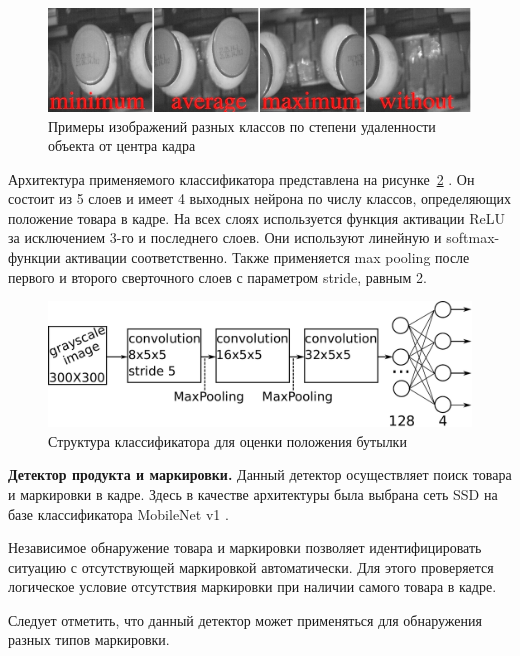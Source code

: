 \begin{figure}[ht]
	\centering
	\includegraphics[width=16cm]{man-source/images/ch4/pic4-24.jpg}
	\caption{Примеры изображений разных классов по степени удаленности объекта от центра кадра}
	\label{fig:distance_classes}
\end{figure}

Архитектура применяемого классификатора представлена на рисунке~\ref{fig:nn_class1} \cite{7-A}. Он состоит из 5 слоев и имеет 4 выходных нейрона по числу классов, определяющих положение товара в кадре. На всех слоях используется функция активации ReLU за исключением 3-го и последнего слоев. Они используют линейную и softmax-функции активации соответственно. Также применяется max pooling после первого и второго сверточного слоев с параметром stride, равным 2.

\begin{figure}[ht]
	\centering
	\includegraphics[width=16cm]{man-source/images/ch4/pic4-4.pdf}
	\caption{Структура классификатора для оценки положения бутылки \cite{26-A}}
	\label{fig:nn_class1}
\end{figure}

\textbf{Детектор продукта и маркировки.} Данный детектор осуществляет поиск товара и маркировки в кадре. Здесь в качестве архитектуры была выбрана сеть SSD \cite[c.~2-4]{liu} на базе классификатора MobileNet v1 \cite[c.~4]{howard}.

Независимое обнаружение товара и маркировки позволяет идентифицировать ситуацию с отсутствующей маркировкой автоматически. Для этого проверяется логическое условие отсутствия маркировки при наличии самого товара в кадре.

Следует отметить, что данный детектор может применяться для обнаружения разных типов маркировки.

